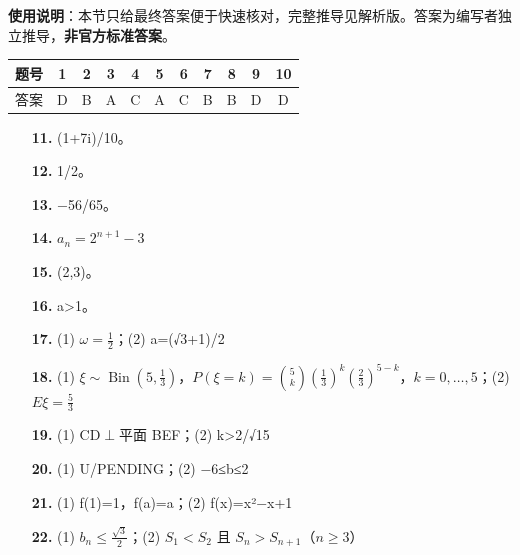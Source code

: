 
\begin{gknotice}
\textbf{使用说明}：本节只给最终答案便于快速核对，完整推导见解析版。答案为编写者独立推导，\textbf{非官方标准答案}。
\end{gknotice}

\begin{center}\begin{tabular}{ccccccccccc}
\toprule
题号 & 1 & 2 & 3 & 4 & 5 & 6 & 7 & 8 & 9 & 10 \\
\midrule
答案 & D & B & A & C & A & C & B & B & D & D \\
\bottomrule
\end{tabular}\end{center}

\begin{itemize}[leftmargin=2.6em]
  \item[\textbf{11.}] (1+7i)/10。
  \item[\textbf{12.}] 1/2。
  \item[\textbf{13.}] $-$56/65。
  \item[\textbf{14.}] $a_n=2^{n+1}-3$
  \item[\textbf{15.}] (2,3)。
  \item[\textbf{16.}] a>1。
\end{itemize}

\begin{itemize}[leftmargin=2.6em]
  \item[\textbf{17.}] (1) $\omega=\frac12$；(2) a=(√3+1)/2
  \item[\textbf{18.}] (1) $\xi\sim\operatorname{Bin}(5,\frac13)$，$P(\xi=k)=\binom{5}{k}(\frac13)^k(\frac23)^{5-k}$，$k=0,\ldots,5$；(2) $E\xi=\frac53$
  \item[\textbf{19.}] (1) CD$\perp$平面 BEF；(2) k>2/√15
  \item[\textbf{20.}] (1) U/PENDING；(2) $-$6≤b≤2
  \item[\textbf{21.}] (1) f(1)=1，f(a)=a；(2) f(x)=x²$-$x+1
  \item[\textbf{22.}] (1) $b_n\le\frac{\sqrt3}{2}$；(2) $S_1<S_2$ 且 $S_n>S_{n+1}$（$n\ge3$）
\end{itemize}
